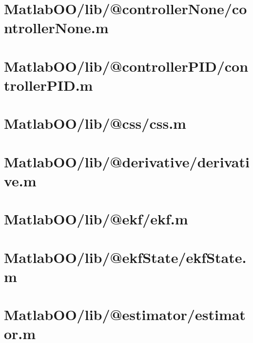 \pagebreak
\section{MatlabOO/lib/@controllerNone/controllerNone.m}\label{code:MatlabOO/lib/@controllerNone/controllerNone.m}


\pagebreak
\section{MatlabOO/lib/@controllerPID/controllerPID.m}\label{code:MatlabOO/lib/@controllerPID/controllerPID.m}


\pagebreak
\section{MatlabOO/lib/@css/css.m}\label{code:MatlabOO/lib/@css/css.m}


\pagebreak
\section{MatlabOO/lib/@derivative/derivative.m}\label{code:MatlabOO/lib/@derivative/derivative.m}


\pagebreak
\section{MatlabOO/lib/@ekf/ekf.m}\label{code:MatlabOO/lib/@ekf/ekf.m}


\pagebreak
\section{MatlabOO/lib/@ekfState/ekfState.m}\label{code:MatlabOO/lib/@ekfState/ekfState.m}


\pagebreak
\section{MatlabOO/lib/@estimator/estimator.m}\label{code:MatlabOO/lib/@estimator/estimator.m}



